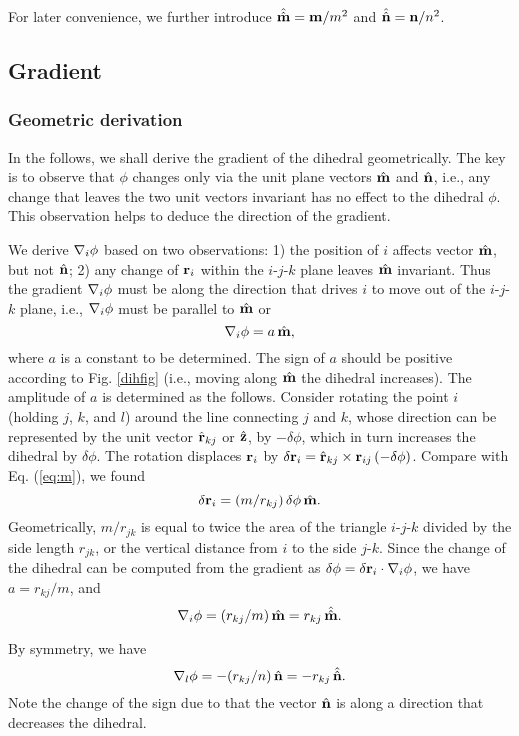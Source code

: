 \documentclass{article}
\begin{document}
For later convenience, we further introduce
$\hat{\hat{\mathbf{m}}} = \mathbf{m}/m^2$ and $\hat{\hat{\mathbf{n}}} = \mathbf{n}/n^2$.




\subsection{Gradient}

\subsubsection{Geometric derivation}

In the follows, we shall derive the gradient of the dihedral geometrically.
%
The key is to observe that $\phi$ changes only via the unit plane vectors $\hat{\mathbf{m}}$ and $\hat{\mathbf{n}}$,
i.e., any change that leaves the two unit vectors invariant has no effect to
the dihedral $\phi$.
This observation helps to deduce the direction of the gradient.

We derive $\nabla_i \phi$ based on two observations:
1) the position of $i$ affects vector $\hat{\mathbf{m}}$, but not $\hat{\mathbf{n}}$;
2) any change of $\mathbf{r}_i$ within the $i$-$j$-$k$ plane leaves $\hat{\mathbf{m}}$ invariant.
%
Thus the gradient $\nabla_i \phi$ must be along the direction that
    drives $i$ to move out of the $i$-$j$-$k$ plane,
i.e., $\nabla_i \phi$ must be parallel to $\hat{\mathbf{m}}$ or
\[
\nabla_i \phi  = a \, \hat{\mathbf{m}},
\]
where $a$ is a constant to be determined.
%
The sign of $a$ should be positive according to Fig. \ref{dihfig} (i.e., moving along $\hat{\mathbf{m}}$ the dihedral increases).
%
The amplitude of $a$ is determined as the follows.
Consider rotating the point $i$ (holding $j$, $k$, and $l$) around
the line connecting $j$ and $k$, whose direction can be represented by the unit vector $\hat{\mathbf{r}}_{kj}$ or $\hat{\mathbf{z}}$,
by $-\delta \phi$, which in turn increases the dihedral by $\delta \phi$.
The rotation displaces $\mathbf{r}_i$  by
$\delta \mathbf{r}_i = \hat{\mathbf{r}}_{kj} \times \mathbf{r}_{ij} \, (-\delta \phi)$.
Compare with Eq. (\ref{eq:m}), we found
\[
 \delta \mathbf{r}_i =  (m/r_{kj}) \, \delta \phi \, \hat{\mathbf{m}}.
\]
Geometrically, $m/r_{jk}$ is equal to twice the area of the triangle $i$-$j$-$k$
 divided by the side length $r_{jk}$,
or the vertical distance from $i$ to the side $j$-$k$.
%
%
Since the change of the dihedral can be computed from the gradient as
$\delta \phi = \delta \mathbf{r}_i \cdot \nabla_i \phi $, we have
$a = r_{kj}/m$, and
\[
\nabla_i \phi = (r_{kj}/m) \, \hat{\mathbf{m}} = r_{kj} \, \hat{\hat{\mathbf{m}}}.
\]

By symmetry, we have
\[
\nabla_l \phi = -(r_{kj}/n) \, \hat{\mathbf{n}} = -r_{kj} \, \hat{\hat{\mathbf{n}}}.
\]
Note the change of the sign due to that
the vector $\hat{\mathbf{n}}$ is along a direction that decreases the dihedral.
\end{document}

